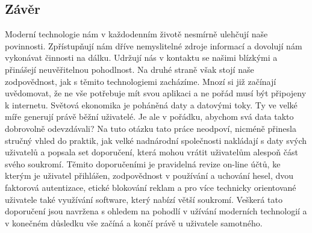 \documentclass{article}
\begin{document}
\begin{spacing}{1.15}
		\section*{Závěr}
		Moderní technologie nám v každodenním životě nesmírně ulehčují naše povinnosti. Zpřístupňují nám dříve nemyslitelné zdroje informací a dovolují nám vykonávat činnosti na dálku. Udržují nás v kontaktu se našimi blízkými a přinášejí neuvěřitelnou pohodlnost. Na druhé straně však stojí naše zodpovědnost, jak s těmito technologiemi zacházíme. Mnozí si již začínají uvědomovat, že ne vše potřebuje mít svou aplikaci a ne pořád musí být připojeny k internetu. Světová ekonomika je poháněná daty a datovými toky. Ty ve velké míře generují právě běžní uživatelé. Je ale v pořádku, abychom svá data takto dobrovolně odevzdávali? Na tuto otázku tato práce neodpoví, nicméně přinesla stručný vhled do praktik, jak velké nadnárodní společnosti nakládají s daty svých uživatelů a popsala set doporučení, která mohou vrátit uživatelům alespoň část svého soukromí. Těmito doporučeními je pravidelná revize on-line účtů, ke kterým je uživatel přihlášen, zodpovědnost v  používání a uchování hesel, dvou faktorová autentizace, etické blokování reklam a pro více technicky orientované uživatele také využívání software, který nabízí větší soukromí. Veškerá tato doporučení jsou navržena s ohledem na pohodlí v užívání moderních technologií a v konečném důsledku vše začíná a končí právě u uživatele samotného.
		\pagebreak
		
		\printbibliography[title={Bibliografie}]
		
	\end{spacing}
\end{document}
